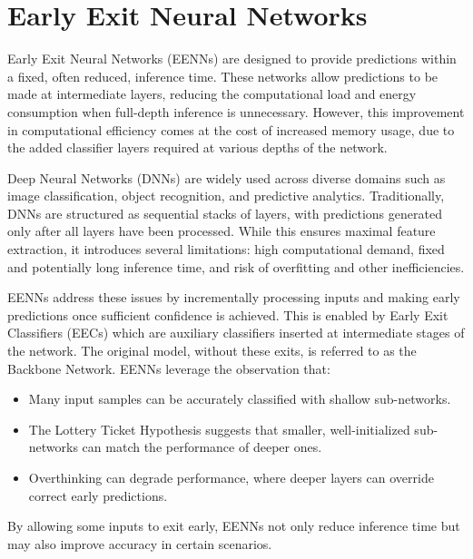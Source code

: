 \section{Early Exit Neural Networks}

Early Exit Neural Networks (EENNs) are designed to provide predictions within a fixed, often reduced, inference time. 
These networks allow predictions to be made at intermediate layers, reducing the computational load and energy consumption when full-depth inference is unnecessary. 
However, this improvement in computational efficiency comes at the cost of increased memory usage, due to the added classifier layers required at various depths of the network.

Deep Neural Networks (DNNs) are widely used across diverse domains such as image classification, object recognition, and predictive analytics. 
Traditionally, DNNs are structured as sequential stacks of layers, with predictions generated only after all layers have been processed. 
While this ensures maximal feature extraction, it introduces several limitations: high computational demand, fixed and potentially long inference time, and risk of overfitting and other inefficiencies.

EENNs address these issues by incrementally processing inputs and making early predictions once sufficient confidence is achieved. 
This is enabled by Early Exit Classifiers (EECs) which are auxiliary classifiers inserted at intermediate stages of the network. 
The original model, without these exits, is referred to as the Backbone Network.
EENNs leverage the observation that:
\begin{itemize}
    \item Many input samples can be accurately classified with shallow sub-networks.
    \item The Lottery Ticket Hypothesis suggests that smaller, well-initialized sub-networks can match the performance of deeper ones.
    \item Overthinking can degrade performance, where deeper layers can override correct early predictions.
\end{itemize}
\noindent By allowing some inputs to exit early, EENNs not only reduce inference time but may also improve accuracy in certain scenarios.

